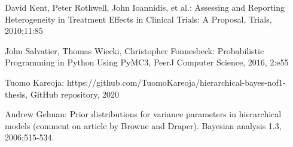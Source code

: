 \documentclass[12pt,a4paper,leqno]{report}
\theoremstyle{plain}
\theoremstyle{definition}
\theoremstyle{remark}
\begin{document}
\begin{thebibliography}{4}
    David Kent, Peter Rothwell, John Ioannidis, et al.: Assessing and Reporting Heterogeneity in
    Treatment Effects in Clinical Trials: A Proposal, Trials, 2010;11:85

    John Salvatier, Thomas Wiecki, Christopher Fonnesbeck: Probabilistic Programming in Python Using PyMC3, PeerJ Computer
    Science, 2016, 2:e55

    Tuomo Kareoja: https://github.com/TuomoKareoja/hierarchical-bayes-nof1-thesis,
    GitHub repository, 2020

    Andrew Gelman: Prior distributions for variance parameters in hierarchical models
    (comment on article by Browne and Draper). Bayesian analysis 1.3, 2006;515-534.

\end{thebibliography}
\end{document}
